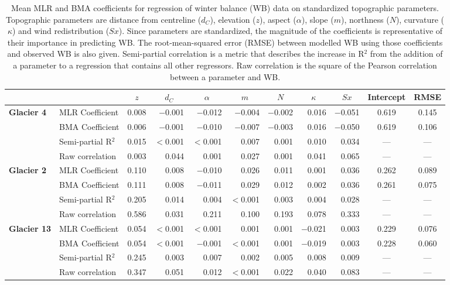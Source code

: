 \documentclass{sfuthesis}
\newcommand{\params}{Topographic parameters are distance from centreline ($d_C$), elevation ($z$), aspect ($\alpha$), slope ($m$), northness ($N$), curvature ($\kappa$) and wind redistribution ($Sx$). }
\begin{document}
\begin{table}
\centering
\caption{Mean MLR and BMA coefficients for regression of winter balance (WB) data on standardized topographic parameters. \params  Since parameters are standardized, the magnitude of the coefficients is representative of their importance in predicting WB. The root-mean-squared error (RMSE) between modelled WB using those coefficients and observed WB is also given. Semi-partial correlation is a metric that describes the increase in R$^2$ from the addition of a parameter to a regression that contains all other regressors. Raw correlation is the square of the Pearson correlation between a parameter and WB.}
\label{tab:MLRmeancoeff}
\begin{tabular}{ll|rrrrrrrc|c}
 &  & \multicolumn{1}{c}{$z$} & \multicolumn{1}{c}{$d_C$} & \multicolumn{1}{c}{$\alpha$} & \multicolumn{1}{c}{$m$} & \multicolumn{1}{c}{$N$} & \multicolumn{1}{c}{$\kappa$} & \multicolumn{1}{c}{$Sx$} & Intercept & RMSE \\ \hline \hline
\multirow{4}{*}{\textbf{Glacier 4}} & MLR Coefficient & 0.008 & $-$0.001 & $-$0.012 & $-$0.004 & $-$0.002 & 0.016 & $-$0.051 & 0.619 & 0.145 \\
 & BMA Coefficient & 0.006 & $-$0.001 & $-$0.010 & $-$0.007 & $-$0.003 & 0.016 & $-$0.050 & 0.619 & 0.106 \\
 & Semi-partial R$^2$ & 0.015 & $<$0.001 & $<$0.001 & 0.007 & 0.001 & 0.010 & 0.034 & --- & --- \\
 & Raw correlation & 0.003 & 0.044 & 0.001 & 0.027 & 0.001 & 0.041 & 0.065 & --- & --- \\ \hline
\multirow{4}{*}{\textbf{Glacier 2}} & MLR Coefficient & 0.110 & 0.008 & $-$0.010 & 0.026 & 0.011 & 0.001 & 0.036 & 0.262 & 0.089 \\
 & BMA Coefficient & 0.111 & 0.008 & $-$0.011 & 0.029 & 0.012 & 0.002 & 0.036 & 0.261 & 0.075 \\
 & Semi-partial R$^2$ & 0.205 & 0.014 & 0.004 & $<$0.001 & 0.003 & 0.004 & 0.028 & --- & --- \\
 & Raw correlation & 0.586 & 0.031 & 0.211 & 0.100 & 0.193 & 0.078 & 0.333 & --- & --- \\ \hline
\multirow{4}{*}{\textbf{Glacier 13}} & MLR Coefficient & 0.054 & $<$0.001 & $<$0.001 & 0.001 & 0.001 & $-$0.021 & 0.003 & 0.229 & 0.076 \\
 & BMA Coefficient & 0.054 & $<$0.001 & $-$0.001 & $<$0.001 & 0.001 & $-$0.019 & 0.003 & 0.228 & 0.060 \\
 & Semi-partial R$^2$ & 0.245 & 0.003 & 0.007 & 0.002 & 0.005 & 0.008 & 0.009 & --- & --- \\
 & Raw correlation & 0.347 & 0.051 & 0.012 & $<$0.001 & 0.022 & 0.040 & 0.083 & --- & ---
\end{tabular}
\end{table}
\end{document}
